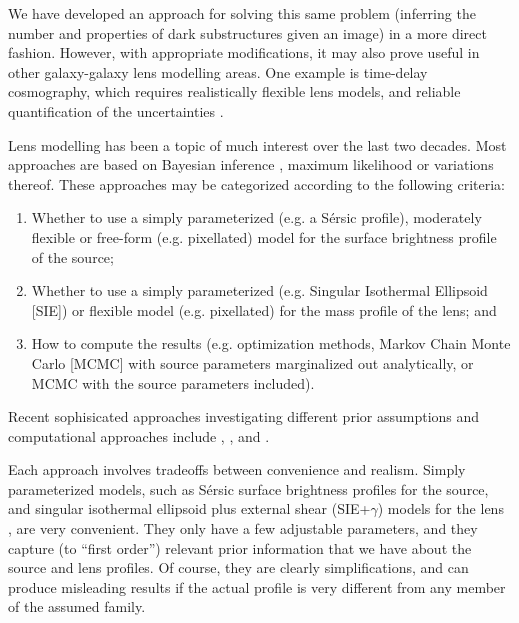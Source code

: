 \documentclass[useAMS,usenatbib]{mn2e}
\begin{document}
We have developed an approach for solving this same problem (inferring the
number and properties of dark substructures given an image) in a more direct
fashion. However, with appropriate modifications, it may also prove useful in other
galaxy-galaxy lens modelling areas. One example is time-delay cosmography, which
requires realistically flexible lens models, and reliable quantification
of the uncertainties
\citep{2013ApJ...766...70S, 2014ApJ...788L..35S, grillo}.

Lens modelling has been a topic of much interest over the last two decades.
Most approaches are based on Bayesian inference \citep{sivia, ohagan}, maximum
likelihood \citep{millar} or
variations thereof. These approaches may be categorized according to the
following criteria:
\begin{enumerate}
\item Whether to use a simply parameterized (e.g. a Sérsic profile),
moderately flexible \citep[e.g. a mixture model,][]{2011MNRAS.412.2521B}
or free-form (e.g. pixellated) model for the surface brightness profile of the source;\\
\item Whether to use a simply parameterized (e.g. Singular Isothermal Ellipsoid
[SIE]) or flexible model (e.g. pixellated) for the mass profile of the lens; and\\
\item How to compute the results (e.g. optimization methods, Markov Chain
Monte Carlo [MCMC] with source parameters marginalized out analytically, or
MCMC with the source parameters included).
\end{enumerate}
Recent sophisicated approaches investigating different prior assumptions
and computational approaches include \citet{2014MNRAS.445.2181C},
\citet{2015arXiv150500198T}, and
\citet{2015arXiv150407629B}. 

Each approach involves tradeoffs between convenience and realism.
Simply parameterized models, such as Sérsic surface
brightness profiles for the source,
and singular isothermal ellipsoid plus
external shear (SIE+$\gamma$) models for the lens \citep{1994A&A...284..285K},
are very
convenient. They only have a few adjustable parameters, and they capture
(to ``first order'') relevant prior information that we have about the
source and lens profiles. Of course, they are clearly simplifications,
and can produce misleading results if the actual profile is very different
from any member of the assumed family.
\end{document}
